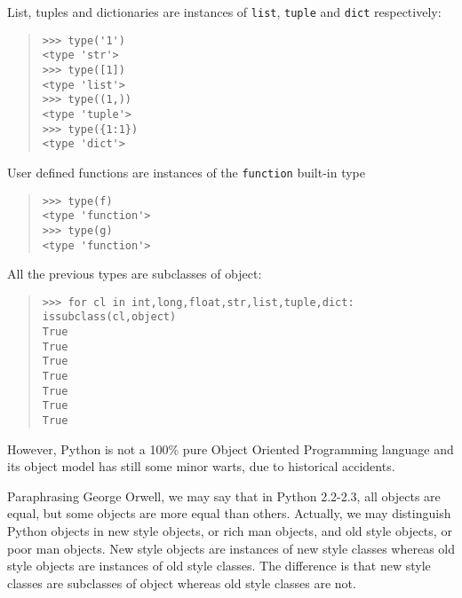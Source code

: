 \documentclass[10pt,english]{article}
\begin{document}
\begin{list}{.}
{
\addtocounter{listcnt9}{4}
\setlength{\rightmargin}{\leftmargin}
}
\item {} 
List, tuples and dictionaries are instances of \texttt{list}, \texttt{tuple} and
\texttt{dict} respectively:

\end{list}
\begin{quote}
\begin{verbatim}>>> type('1')
<type 'str'>
>>> type([1])
<type 'list'>
>>> type((1,))
<type 'tuple'>
>>> type({1:1})
<type 'dict'>\end{verbatim}
\end{quote}
\begin{list}{.}
{
\addtocounter{listcnt10}{5}
\setlength{\rightmargin}{\leftmargin}
}
\item {} 
User defined functions are instances of the \texttt{function} built-in type

\end{list}
\begin{quote}
\begin{verbatim}>>> type(f)
<type 'function'>
>>> type(g)
<type 'function'>\end{verbatim}
\end{quote}

All the previous types are subclasses of object:
\begin{quote}
\begin{verbatim}>>> for cl in int,long,float,str,list,tuple,dict: issubclass(cl,object)
True
True
True
True
True
True
True\end{verbatim}
\end{quote}

However, Python is not a 100{\%} pure Object
Oriented Programming language and its object model has still some minor
warts, due to historical accidents.

Paraphrasing George Orwell, we may say that in Python 2.2-2.3, 
all objects are equal, but some objects are more equal than others.
Actually, we may distinguish Python objects in new style objects, 
or rich man objects, and old style objects, or poor man objects. 
New style objects are instances of new style classes whereas old
style objects are instances of old style classes.
The difference is that new style classes are subclasses of object whereas
old style classes are not.
\end{document}
